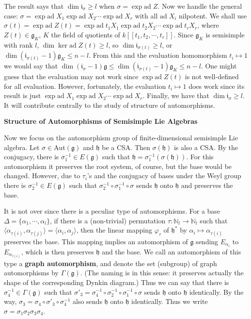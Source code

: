 \documentclass{article}
\newcommand{\NaN}{\mathbb{N}}
\newcommand{\lie}[1]{\mathfrak{#1}}
\newcommand{\ad}[1]{\mathrm{ad}\; #1}
\begin{document}
The result says that $\dim{\lie{i}_\sigma} \ge l$ when $\sigma = \exp{\ad{Z}}$.
Now we handle the general case: $\sigma = \exp{\ad{X_1}} \exp{\ad{X_2}} \cdots \exp{\ad{X_r}}$ with all $\ad{X_i}$ nilpotent.
We shall use $\sigma(t) = \exp{\ad{Z(t)}} = \exp{\ad{t_1 X_1}} \exp{\ad{t_2 X_2}} \cdots \exp{\ad{t_r X_r}}$, where $Z(t) \in \lie{g}_K$, $K$ the field of quotients of $k[[t_1, t_2, \cdots, t_r]]$.
Since $\lie{g}_K$ is semisimple with rank $l$, $\dim{\ker{\ad{Z(t)}}} \ge l$, so $\dim{\lie{i}_{\sigma(t)}} \ge l$, or $\dim{(\lie{i}_{\sigma(t)} - 1) \lie{g}_K} \le n - l$.
From this and the evaluation homomorphism $t_i \mapsto 1$ we would say that $\dim{(\lie{i}_{\sigma} - 1) \lie{g}} \le \dim{(\lie{i}_{\sigma(t)} - 1) \lie{g}_K} \le n - l$.
One might guess that the evaluation may not work since $\exp{\ad{Z(t)}}$ is not well-defined for all evaluation.
However, fortunately, the evaluation $t_i \mapsto 1$ does work since its result is just $\exp{\ad{X_1}} \exp{\ad{X_2}} \cdots \exp{\ad{X_r}}$.
Finally, we have that $\dim{\lie{i}_\sigma} \ge l$.
It will contribute centrally to the study of structure of automorphisms.

\newpage

\textbf{Structure of Automorphisms of Semisimple Lie Algebras}

Now we focus on the automorphism group of finite-dimensional semisimple Lie algebra.
Let $\sigma \in \textrm{Aut}(\lie{g})$ and $\lie{h}$ be a CSA.
Then $\sigma(\lie{h})$ is also a CSA.
By the conjugacy, there is $\sigma_1^{-1} \in E(\lie{g})$ such that $\lie{h} = \sigma_1^{-1} (\sigma(\lie{h}))$.
For this automorphism it preserves the root system, of course, but the base would be changed.
However, due to $\tau_i$'s and the conjugacy of bases under the Weyl group there is $\sigma_2^{-1} \in E(\lie{g})$ such that $\sigma_2^{-1} \circ \sigma_1^{-1} \circ \sigma$ sends $\lie{h}$ onto $\lie{h}$ and preserves the base.

It is not over since there is a peculiar type of automorphisms.
For a base $\Delta = \{\alpha_1, \cdots, \alpha_l\}$, if there is a (non-trivial) permutation $\tau : \NaN_l \to \NaN_l$ such that $\langle \alpha_{\tau(i)}, \alpha_{\tau(j)} \rangle = \langle \alpha_i, \alpha_j \rangle$, then the linear mapping $\varphi_\tau$ of $\lie{h}^*$ by $\alpha_i \mapsto \alpha_{\tau(i)}$ preserves the base.
This mapping implies an automorphism of $\lie{g}$ sending $E_{\alpha_i}$ to $E_{\alpha_{\tau(i)}}$, which is then preserves $\lie{h}$ and the base.
We call an automorphism of this type a \textbf{graph automorphism}, and denote the set (subgroup) of graph automorphisms by $\Gamma(\lie{g})$.
(The naming is in this sense: it preserves actually the shape of the corresponding Dynkin diagram.)
Thus we can say that there is $\sigma_4^{-1} \in \Gamma(\lie{g})$ such that $\sigma'_3 = \sigma_4^{-1} \circ \sigma_2^{-1} \circ \sigma_1^{-1} \circ \sigma$ sends $\lie{h}$ onto $\lie{h}$ identically.
By the way, $\sigma_3 = \sigma_4 \circ \sigma'_3 \circ \sigma_4^{-1}$ also sends $\lie{h}$ onto $\lie{h}$ identically.
Thus we write $\sigma = \sigma_1 \sigma_2 \sigma_3 \sigma_4$.
\end{document}
